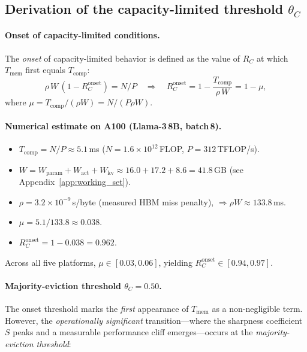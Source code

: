 \subsection{Derivation of the capacity-limited threshold $\theta_C$}
\label{app:thetaC}

\paragraph{Onset of capacity-limited conditions.}
The \emph{onset} of capacity-limited behavior is defined as the value of $R_C$
at which $T_{\mathrm{mem}}$ first equals $T_{\mathrm{comp}}$:
\begin{equation}
\rho \, W \, (1 - R_C^{\mathrm{onset}}) = N / P
\quad\Longrightarrow\quad
R_C^{\mathrm{onset}} = 1 - \frac{T_{\mathrm{comp}}}{\rho\,W} = 1 - \mu,
\label{eq:thetaC_onset}
\end{equation}
where $\mu = T_{\mathrm{comp}} / (\rho W) = N/(P\rho W)$.

\paragraph{Numerical estimate on A100 (Llama-3\,8B, batch\,8).}
\begin{itemize}
  \item $T_{\mathrm{comp}} = N/P \approx 5.1$\,ms\quad
        ($N=1.6{\times}10^{12}$\,FLOP, $P=312$\,TFLOP/s).
  \item $W = W_{\mathrm{param}} + W_{\mathrm{act}} + W_{\mathrm{kv}}
            \approx 16.0 + 17.2 + 8.6 = 41.8$\,GB\quad
        (see Appendix~\ref{app:working_set}).
  \item $\rho = 3.2 \times 10^{-9}$\,s/byte (measured HBM miss penalty),
        $\Rightarrow \rho W \approx 133.8$\,ms.
  \item $\mu = 5.1 / 133.8 \approx 0.038$.
  \item $R_C^{\mathrm{onset}} = 1 - 0.038 = 0.962$.
\end{itemize}
Across all five platforms, $\mu \in [0.03, 0.06]$, yielding
$R_C^{\mathrm{onset}} \in [0.94, 0.97]$.

\paragraph{Majority-eviction threshold $\theta_C = 0.50$.}
The onset threshold marks the \emph{first} appearance of $T_{\mathrm{mem}}$
as a non-negligible term. However, the \emph{operationally significant}
transition---where the sharpness coefficient $S$ peaks and a measurable
performance cliff emerges---occurs at the \emph{majority-eviction threshold}:


